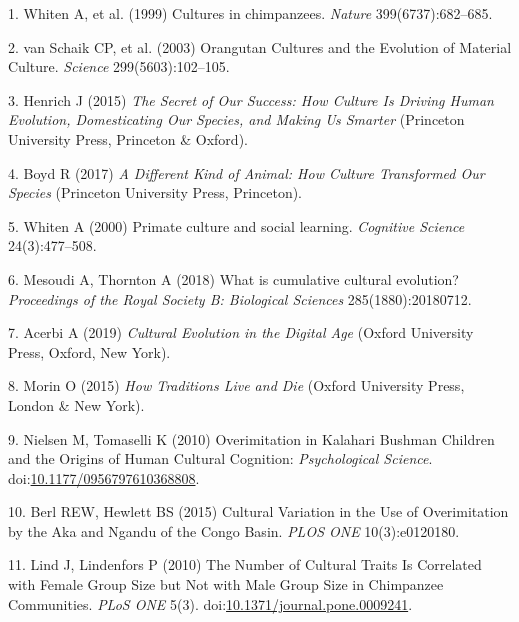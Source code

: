 \documentclass[9pt,twocolumn,twoside,]{pnas-new}
\begin{document}
\showmatmethods
\showacknow
\pnasbreak

\hypertarget{refs}{}
\hypertarget{ref-whiten_cultures_1999}{}
1. Whiten A, et al. (1999) Cultures in chimpanzees. \emph{Nature}
399(6737):682--685.

\hypertarget{ref-van_schaik_orangutan_2003}{}
2. van Schaik CP, et al. (2003) Orangutan Cultures and the Evolution of
Material Culture. \emph{Science} 299(5603):102--105.

\hypertarget{ref-henrich_secret_2015}{}
3. Henrich J (2015) \emph{The Secret of Our Success: How Culture Is
Driving Human Evolution, Domesticating Our Species, and Making Us
Smarter} (Princeton University Press, Princeton \& Oxford).

\hypertarget{ref-boyd_different_2017}{}
4. Boyd R (2017) \emph{A Different Kind of Animal: How Culture
Transformed Our Species} (Princeton University Press, Princeton).

\hypertarget{ref-whiten_primate_2000}{}
5. Whiten A (2000) Primate culture and social learning. \emph{Cognitive
Science} 24(3):477--508.

\hypertarget{ref-mesoudi_what_2018}{}
6. Mesoudi A, Thornton A (2018) What is cumulative cultural evolution?
\emph{Proceedings of the Royal Society B: Biological Sciences}
285(1880):20180712.

\hypertarget{ref-acerbi_cultural_2019}{}
7. Acerbi A (2019) \emph{Cultural Evolution in the Digital Age} (Oxford
University Press, Oxford, New York).

\hypertarget{ref-morin_how_2015}{}
8. Morin O (2015) \emph{How Traditions Live and Die} (Oxford University
Press, London \& New York).

\hypertarget{ref-nielsen_overimitation_2010}{}
9. Nielsen M, Tomaselli K (2010) Overimitation in Kalahari Bushman
Children and the Origins of Human Cultural Cognition:
\emph{Psychological Science}.
doi:\href{https://doi.org/10.1177/0956797610368808}{10.1177/0956797610368808}.

\hypertarget{ref-berl_cultural_2015}{}
10. Berl REW, Hewlett BS (2015) Cultural Variation in the Use of
Overimitation by the Aka and Ngandu of the Congo Basin. \emph{PLOS ONE}
10(3):e0120180.

\hypertarget{ref-lind_number_2010}{}
11. Lind J, Lindenfors P (2010) The Number of Cultural Traits Is
Correlated with Female Group Size but Not with Male Group Size in
Chimpanzee Communities. \emph{PLoS ONE} 5(3).
doi:\href{https://doi.org/10.1371/journal.pone.0009241}{10.1371/journal.pone.0009241}.
\end{document}
